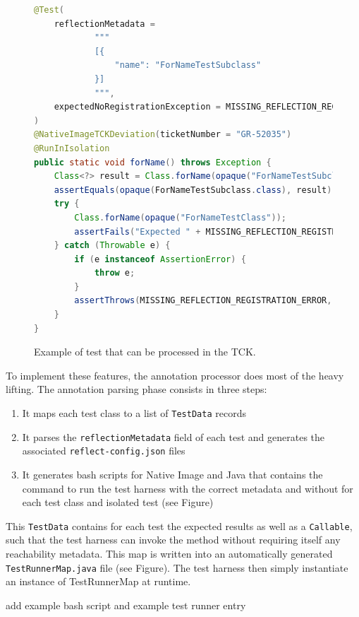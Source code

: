 \begin{figure}[ht]
    \centering
\begin{lstlisting}[language=Java]
@Test(
    reflectionMetadata =
            """
            [{
                "name": "ForNameTestSubclass"
            }]
            """,
    expectedNoRegistrationException = MISSING_REFLECTION_REGISTRATION_ERROR
)
@NativeImageTCKDeviation(ticketNumber = "GR-52035")
@RunInIsolation
public static void forName() throws Exception {
    Class<?> result = Class.forName(opaque("ForNameTestSubclass"));
    assertEquals(opaque(ForNameTestSubclass.class), result);
    try {
        Class.forName(opaque("ForNameTestClass"));
        assertFails("Expected " + MISSING_REFLECTION_REGISTRATION_ERROR + " to be thrown.");
    } catch (Throwable e) {
        if (e instanceof AssertionError) {
            throw e;
        }
        assertThrows(MISSING_REFLECTION_REGISTRATION_ERROR, e);
    }
}
\end{lstlisting}
    \caption{Example of test that can be processed in the TCK.}
    \label{fig:tck_for_name}
\end{figure}

To implement these features, the annotation processor does most of the heavy lifting. The annotation parsing phase consists in three steps:
\begin{enumerate}
    \item It maps each test class to a list of \verb|TestData| records 
    \item It parses the \verb|reflectionMetadata| field of each test and generates the associated \verb|reflect-config.json| files
    \item It generates bash scripts for Native Image and Java that contains the command to run the test harness with the correct metadata and without for each test class and isolated test (see Figure)
\end{enumerate}

This \verb|TestData| contains for each test the expected results as well as a \verb|Callable|, such that the test harness can invoke the method without requiring itself any reachability metadata. This map is written into an automatically generated \verb|TestRunnerMap.java| file (see Figure).
The test harness then simply instantiate an instance of TestRunnerMap at runtime.

add example bash script and example test runner entry

